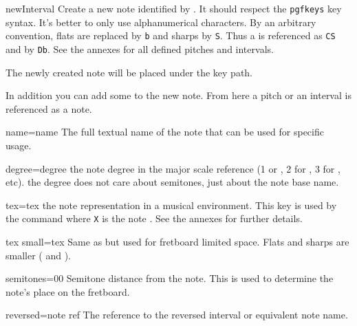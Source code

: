 \documentclass[a4paper]{article}
\newcommand{\pkg}[1]{\texttt{#1}}
\begin{document}
\begin{docCommand}{newInterval}{}
  Create a new note identified by . It should respect the
  \pkg{pgfkeys} key syntax. It's better to only use alphanumerical
  characters. By an arbitrary convention, flats are replaced by \texttt{b}
  and sharps by \texttt{S}. Thus a \pCS is referenced as \texttt{CS} and
  \pDb by \texttt{Db}. See the annexes for all defined pitches and
  intervals.

  The newly created note will be placed under the
   key path.
  
  In addition you can add some  to the new note. From here a
  pitch or an interval is referenced as a note.

  \begin{docKey}{name}{=name}{}
    The full textual name of the note that can be used for specific usage.
  \end{docKey}

  \begin{docKey}{degree}{=degree}{}
    the note degree in the \pC major scale reference (1 or \pC, 2 for \pD, 3
    for \pE, etc). the degree does not care about semitones, just about the
    note base name.
  \end{docKey}

  \begin{docKey}{tex}{=tex}{}
    the note representation in a musical environment. This key is used by
    the  command where \texttt{X} is the note . See the
    annexes for further details.
  \end{docKey}

  \begin{docKey}{tex small}{=tex}{}
    Same as  but used for fretboard limited
    space. Flats and sharps are smaller ( and
    ).
  \end{docKey}

  \begin{docKey}{semitones}{=0}{0}
    Semitone distance from the \pC note. This is used to determine the
    note's place on the fretboard.
  \end{docKey}

  \begin{docKey}{reversed}{=note ref}{}
    The reference to the reversed interval  or equivalent note name.
  \end{docKey}


\end{docCommand}
\end{document}
